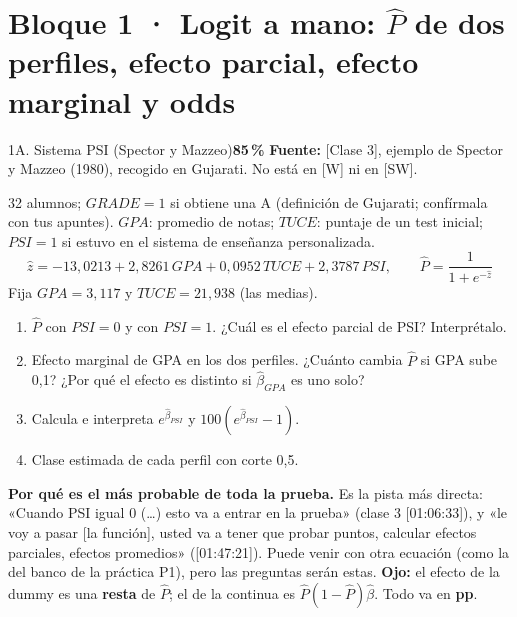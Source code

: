 \documentclass[11pt]{article}
\newcommand{\prob}[1]{\colorbox{red!15}{\textbf{#1}}}
\newcommand{\fuente}[1]{{\small\textcolor{blue!50!black}{\textbf{Fuente:} #1}}\par}
\newcommand{\bloque}[2]{\section*{Bloque #1 · #2}}
\begin{document}
\bloque{1}{Logit a mano: $\hat P$ de dos perfiles, efecto parcial, efecto marginal y odds}

\begin{ej}{1A. Sistema PSI (Spector y Mazzeo)}{\prob{85\,\%}}
\fuente{[Clase 3], ejemplo de Spector y Mazzeo (1980), recogido en Gujarati. No está en [W] ni en [SW].}
32 alumnos; $GRADE=1$ si obtiene una A (definición de Gujarati; confírmala con tus apuntes). $GPA$: promedio de notas; $TUCE$: puntaje de un test inicial; $PSI=1$ si estuvo en el sistema de enseñanza personalizada.
\[\hat z=-13{,}0213+2{,}8261\,GPA+0{,}0952\,TUCE+2{,}3787\,PSI,\qquad \hat P=\frac{1}{1+e^{-\hat z}}\]
Fija $GPA=3{,}117$ y $TUCE=21{,}938$ (las medias).
\begin{enumerate}[label=\alph*),itemsep=0pt,topsep=2pt]
\item $\hat P$ con $PSI=0$ y con $PSI=1$. ¿Cuál es el efecto parcial de PSI? Interprétalo.
\item Efecto marginal de GPA en los dos perfiles. ¿Cuánto cambia $\hat P$ si GPA sube 0,1? ¿Por qué el efecto es distinto si $\hat\beta_{GPA}$ es uno solo?
\item Calcula e interpreta $e^{\hat\beta_{PSI}}$ y $100(e^{\hat\beta_{PSI}}-1)$.
\item Clase estimada de cada perfil con corte 0,5.
\end{enumerate}
\end{ej}
\begin{porque}
\textbf{Por qué es el más probable de toda la prueba.} Es la pista más directa: «Cuando PSI igual 0 (\dots) esto va a entrar en la prueba» (clase 3 [01:06:33]), y «le voy a pasar [la función], usted va a tener que probar puntos, calcular efectos parciales, efectos promedios» ([01:47:21]). Puede venir con otra ecuación (como la del banco de la práctica P1), pero las preguntas serán estas. \textbf{Ojo:} el efecto de la dummy es una \textbf{resta} de $\hat P$; el de la continua es $\hat P(1-\hat P)\hat\beta$. Todo va en \textbf{pp}.
\end{porque}
\end{document}
